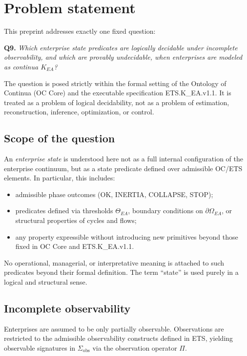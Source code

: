 \section{Problem statement}
\label{sec:problem-statement}

This preprint addresses exactly one fixed question:

\medskip
\noindent
\textbf{Q9.} \emph{Which enterprise state predicates are logically
decidable under incomplete observability, and which are provably
undecidable, when enterprises are modeled as continua $K_{EA}$?}
\medskip

The question is posed strictly within the formal setting of the
Ontology of Continua (OC Core) and the executable specification
ETS.K\_EA.v1.1. It is treated as a problem of logical decidability, not
as a problem of estimation, reconstruction, inference, optimization, or
control.

\subsection{Scope of the question}
\label{subsec:scope-question}

An \emph{enterprise state} is understood here not as a full internal
configuration of the enterprise continuum, but as a state predicate
defined over admissible OC/ETS elements. In particular, this includes:
\begin{itemize}
\item admissible phase outcomes (OK, INERTIA, COLLAPSE, STOP);
\item predicates defined via thresholds $\Theta_{EA}$, boundary
      conditions on $\partial\Omega_{EA}$, or structural properties of
      cycles and flows;
\item any property expressible without introducing new primitives beyond
      those fixed in OC Core and ETS.K\_EA.v1.1.
\end{itemize}

No operational, managerial, or interpretative meaning is attached to
such predicates beyond their formal definition. The term ``state'' is
used purely in a logical and structural sense.

\subsection{Incomplete observability}
\label{subsec:incomplete-observability}

Enterprises are assumed to be only partially observable. Observations
are restricted to the admissible observability constructs defined in
ETS, yielding observable signatures in
$\Sigma_{\mathrm{obs}}$ via the observation operator $\Pi$.

